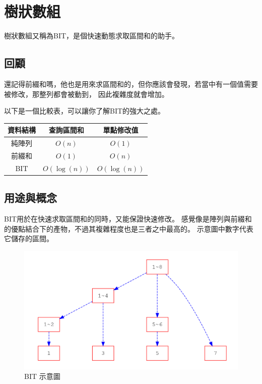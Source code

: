 \section{樹狀數組}
    樹狀數組又稱為BIT，是個快速動態求取區間和的助手。

    \subsection{回顧}
    還記得前綴和嗎，他也是用來求區間和的，但你應該會發現，若當中有一個值需要被修改，那整列都會被動到，
    因此複雜度就會增加。

    以下是一個比較表，可以讓你了解BIT的強大之處。

    \begin{center}
    \begin{tabular}[h]{c|c|c}
        資料結構 & 查詢區間和 & 單點修改值 \\
        \hline
        純陣列 & $O(n)$ & $O(1)$ \\
        前綴和 & $O(1)$ & $O(n)$ \\
        BIT & $O(\log(n))$ & $O(\log(n))$ \\
    \end{tabular}
    \end{center}
    
    \subsection{用途與概念}
    BIT用於在快速求取區間和的同時，又能保證快速修改。
    感覺像是陣列與前綴和的優點結合下的產物，不過其複雜程度也是三者之中最高的。
    示意圖中數字代表它儲存的區間。

    \begin{figure}
        \centering
        \includegraphics[width=\textwidth]{../Images/BIT.png}
        \caption{BIT 示意圖}
    \end{figure}

